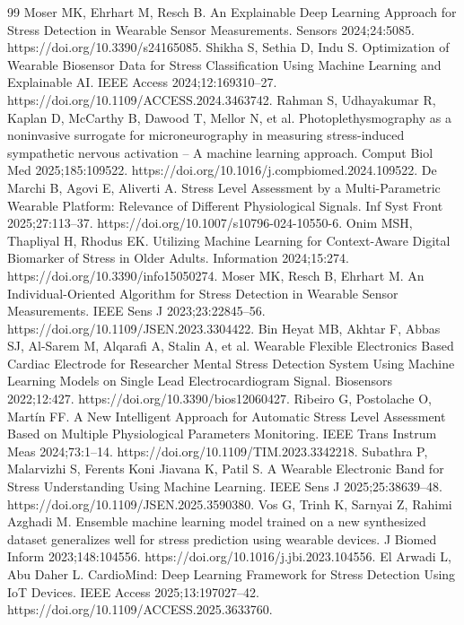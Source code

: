 \begin{thebibliography}{99}
 Moser MK, Ehrhart M, Resch B. An Explainable Deep Learning Approach for Stress Detection in Wearable Sensor Measurements. Sensors 2024;24:5085. https://doi.org/10.3390/s24165085.
 Shikha S, Sethia D, Indu S. Optimization of Wearable Biosensor Data for Stress Classification Using Machine Learning and Explainable AI. IEEE Access 2024;12:169310--27. https://doi.org/10.1109/ACCESS.2024.3463742.
 Rahman S, Udhayakumar R, Kaplan D, McCarthy B, Dawood T, Mellor N, et al. Photoplethysmography as a noninvasive surrogate for microneurography in measuring stress-induced sympathetic nervous activation -- A machine learning approach. Comput Biol Med 2025;185:109522. https://doi.org/10.1016/j.compbiomed.2024.109522.
 De Marchi B, Agovi E, Aliverti A. Stress Level Assessment by a Multi-Parametric Wearable Platform: Relevance of Different Physiological Signals. Inf Syst Front 2025;27:113--37. https://doi.org/10.1007/s10796-024-10550-6.
 Onim MSH, Thapliyal H, Rhodus EK. Utilizing Machine Learning for Context-Aware Digital Biomarker of Stress in Older Adults. Information 2024;15:274. https://doi.org/10.3390/info15050274.
 Moser MK, Resch B, Ehrhart M. An Individual-Oriented Algorithm for Stress Detection in Wearable Sensor Measurements. IEEE Sens J 2023;23:22845--56. https://doi.org/10.1109/JSEN.2023.3304422.
 Bin Heyat MB, Akhtar F, Abbas SJ, Al-Sarem M, Alqarafi A, Stalin A, et al. Wearable Flexible Electronics Based Cardiac Electrode for Researcher Mental Stress Detection System Using Machine Learning Models on Single Lead Electrocardiogram Signal. Biosensors 2022;12:427. https://doi.org/10.3390/bios12060427.
 Ribeiro G, Postolache O, Martín FF. A New Intelligent Approach for Automatic Stress Level Assessment Based on Multiple Physiological Parameters Monitoring. IEEE Trans Instrum Meas 2024;73:1--14. https://doi.org/10.1109/TIM.2023.3342218.
 Subathra P, Malarvizhi S, Ferents Koni Jiavana K, Patil S. A Wearable Electronic Band for Stress Understanding Using Machine Learning. IEEE Sens J 2025;25:38639--48. https://doi.org/10.1109/JSEN.2025.3590380.
 Vos G, Trinh K, Sarnyai Z, Rahimi Azghadi M. Ensemble machine learning model trained on a new synthesized dataset generalizes well for stress prediction using wearable devices. J Biomed Inform 2023;148:104556. https://doi.org/10.1016/j.jbi.2023.104556.
 El Arwadi L, Abu Daher L. CardioMind: Deep Learning Framework for Stress Detection Using IoT Devices. IEEE Access 2025;13:197027--42. https://doi.org/10.1109/ACCESS.2025.3633760.

\end{thebibliography}
